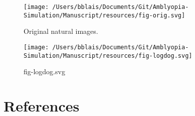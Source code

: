\documentclass[
  onecolumn]{article}
\begin{document}
\begin{figure}
\hypertarget{fig:orig}{%
\centering
\texttt{[image: /Users/bblais/Documents/Git/Amblyopia-Simulation/Manuscript/resources/fig-orig.svg]}
\caption{Original natural images.}\label{fig:orig}
}
\end{figure}

\begin{figure}
\hypertarget{fig:logdog}{%
\centering
\texttt{[image: /Users/bblais/Documents/Git/Amblyopia-Simulation/Manuscript/resources/fig-logdog.svg]}
\caption{fig-logdog.svg}\label{fig:logdog}
}
\end{figure}

\hypertarget{references}{%
\section*{References}\label{references}}
\end{document}
